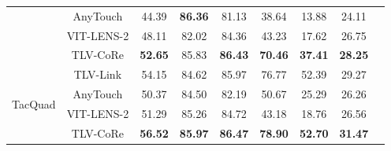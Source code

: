 \documentclass[letterpaper]{article} %
\theoremstyle{definition}                %
\theoremstyle{plain}                     %
\theoremstyle{remark}                    %
\begin{document}
\begin{table}[ht]
\begin{tabular}{@{}c|c|ccc|c|c|cc@{}}
                               & AnyTouch                &    {\cellcolor[HTML]{E2F0D9}44.39}      &    {\cellcolor[HTML]{E2F0D9}\textbf{86.36}}       &  {\cellcolor[HTML]{E2F0D9}81.13}        &             {\cellcolor[HTML]{F0F0F0}38.64}   &         {\cellcolor[HTML]{F0F0F0}13.88}       &         {\cellcolor[HTML]{F0F0F0}24.11}      \\
                               & VIT-LENS-2              &    {\cellcolor[HTML]{E2F0D9}48.11}      &  {\cellcolor[HTML]{E2F0D9}82.02}         &   {\cellcolor[HTML]{E2F0D9}84.36}       &             {\cellcolor[HTML]{F0F0F0}43.23}   &         {\cellcolor[HTML]{F0F0F0}17.62}       &   {\cellcolor[HTML]{F0F0F0}26.75}             \\
                               & TLV-CoRe                &   {\cellcolor[HTML]{E2F0D9}\textbf{52.65}}       &  {\cellcolor[HTML]{E2F0D9}85.83}         &    {\cellcolor[HTML]{E2F0D9}\textbf{86.43}}      &  {\cellcolor[HTML]{F0F0F0}\textbf{70.46}}             &        {\cellcolor[HTML]{F0F0F0}\textbf{37.41}}        &    {\cellcolor[HTML]{F0F0F0}\textbf{28.25}}            \\ \midrule

\multirow{4}{*}{TacQuad}       & TLV-Link                &     {\cellcolor[HTML]{E8F1F9}54.15}     &      {\cellcolor[HTML]{E8F1F9}84.62}     &     {\cellcolor[HTML]{E8F1F9}85.97}     &  {\cellcolor[HTML]{F0F0F0}76.77}  &      {\cellcolor[HTML]{F0F0F0}52.39}   &            {\cellcolor[HTML]{F0F0F0}29.27}                 \\
                               & AnyTouch                &   {\cellcolor[HTML]{E8F1F9}50.37}       & {\cellcolor[HTML]{E8F1F9}84.50}          &    {\cellcolor[HTML]{E8F1F9}82.19}      &    {\cellcolor[HTML]{F0F0F0}50.67}   &     {\cellcolor[HTML]{F0F0F0}25.29}     &                 {\cellcolor[HTML]{F0F0F0}26.26}            \\
                               & VIT-LENS-2              &    {\cellcolor[HTML]{E8F1F9}51.29}      &  {\cellcolor[HTML]{E8F1F9}85.26}         &    {\cellcolor[HTML]{E8F1F9}84.72}      &     {\cellcolor[HTML]{F0F0F0}43.18}   &   {\cellcolor[HTML]{F0F0F0}18.76}  &  {\cellcolor[HTML]{F0F0F0}26.56}               \\
                               & TLV-CoRe                &     {\cellcolor[HTML]{E8F1F9}\textbf{56.52}}     &  {\cellcolor[HTML]{E8F1F9}\textbf{85.97}}         &    {\cellcolor[HTML]{E8F1F9}\textbf{86.47}}      &             {\cellcolor[HTML]{F0F0F0}\textbf{78.90}}   &         {\cellcolor[HTML]{F0F0F0}\textbf{52.70}}       &   {\cellcolor[HTML]{F0F0F0}\textbf{31.47}}    \\
                               \bottomrule[1.2pt]
\end{tabular}%

\vspace{-0.3cm}
\label{tab:synergy}
\vspace{-0.5cm}
\end{table}
\end{document}
